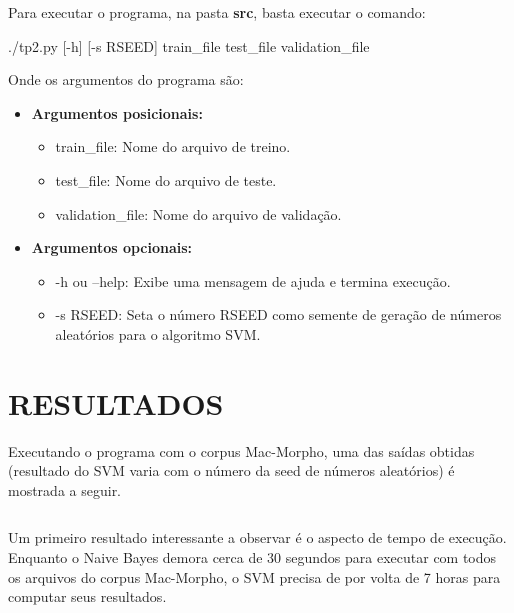 \documentclass[12pt]{article}
\begin{document}
Para executar o programa, na pasta \textbf{src}, basta executar o comando:

\begin{center}
	./tp2.py [-h] [-s RSEED] train\_file test\_file validation\_file
\end{center}

Onde os argumentos do programa são:

\begin{itemize}
	\item \textbf{Argumentos posicionais:}

	\begin{itemize}
		\item train\_file: Nome do arquivo de treino.
		\item test\_file: Nome do arquivo de teste.
		\item validation\_file: Nome do arquivo de validação.
	\end{itemize}

	\item \textbf{Argumentos opcionais:}

	\begin{itemize}
		\item -h ou --help: Exibe uma mensagem de ajuda e termina execução.
		\item -s RSEED: Seta o número RSEED como semente de geração de números
		aleatórios para o algoritmo SVM.
	\end{itemize}
\end{itemize}

\section{RESULTADOS}

Executando o programa com o corpus Mac-Morpho, uma das saídas obtidas (resultado
do SVM varia com o número da seed de números aleatórios) é mostrada a seguir.

\begin{mdframed}[linecolor=black, leftline=false, rightline=false]
    \inputminted[linenos, fontsize=\footnotesize]{text}{../src/out.txt}
\end{mdframed}

Um primeiro resultado interessante a observar é o aspecto de tempo de execução.
Enquanto o Naive Bayes demora cerca de 30 segundos para executar com todos os 
arquivos do corpus Mac-Morpho, o SVM precisa de por volta de 7 horas para computar seus resultados.
\end{document}
